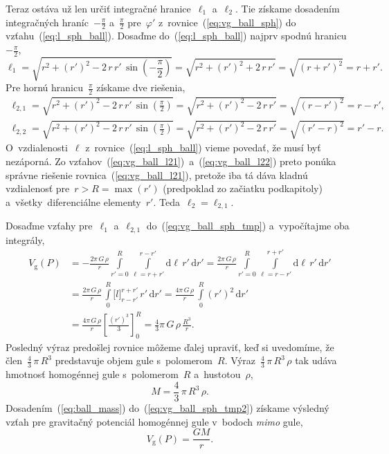 \documentclass[a4paper, 12pt]{book}
\newcommand{\diff}{\mathrm d}
\newcommand{\gidx}{\mathrm g}
\begin{document}
Teraz ostáva už len určiť integračné hranice~$\ell_1$ a~$\ell_2$.  Tie získame 
dosadením integračných hraníc~$-\frac{\pi}{2}$ a~$\frac{\pi}{2}$ pre~$\varphi'$ 
z~rovnice~(\ref{eq:vg_ball_sph}) do vzťahu~(\ref{eq:l_sph_ball}).  Dosaďme 
do~(\ref{eq:l_sph_ball}) najprv spodnú hranicu~$-\frac{\pi}{2}$,
%
\begin{equation}
\label{eq:vg_ball_l1}
\ell_1 = \sqrt{r^2 + (r')^2 - 2 \, r \, r' \, \sin\left(-\frac{\pi}{2}\right)} 
= \sqrt{r^2 + (r')^2 + 2 \, r \, r'} = \sqrt{(r + r')^2} = r + r'{.}
\end{equation}
%
Pre hornú hranicu~$\frac{\pi}{2}$ získame dve riešenia,
%
\begin{align}
\label{eq:vg_ball_l21}
\ell_{2,1} = \sqrt{r^2 + (r')^2 - 2 \, r \, r' \, 
\sin\left(\frac{\pi}{2}\right)} = \sqrt{r^2 + (r')^2 - 2 \, r \, r'} = \sqrt{(r 
- r')^2} = r - r'{,}\\
%
\label{eq:vg_ball_l22}
\ell_{2,2} = \sqrt{r^2 + (r')^2 - 2 \, r \, r' \, 
\sin\left(\frac{\pi}{2}\right)} = \sqrt{r^2 + (r')^2 - 2 \, r \, r'} 
= \sqrt{(r' - r)^2} = r' - r{.}
\end{align}
%
O~vzdialenosti~$\ell$ z~rovnice~(\ref{eq:l_sph_ball}) vieme povedať, že musí 
byť nezáporná.  Zo vzťahov~(\ref{eq:vg_ball_l21})~a~(\ref{eq:vg_ball_l22}) 
preto ponúka správne riešenie rovnica~(\ref{eq:vg_ball_l21}), pretože iba tá 
dáva kladnú vzdialenosť pre~$r > R = \max(r')$ (predpoklad zo začiatku 
podkapitoly) a~všetky~diferenciálne elementy~$r'$.  Teda~$\ell_2 = \ell_{2,1}$.

Dosaďme vzťahy pre~$\ell_1$ a~$\ell_{2,1}$ do~(\ref{eq:vg_ball_sph_tmp}) 
a~vypočítajme oba integrály,
%
\begin{equation}
\label{eq:vg_ball_sph_tmp2}
\begin{split}
V_\gidx(P) &= -\frac{2\pi \, G \, \rho}{r} \int\limits_{r' = 0}^R 
\int\limits_{\ell = r + r'}^{r - r'} \diff \ell \, r' \, \diff r'
%
= \frac{2\pi \, G \, \rho}{r} \int\limits_{r' = 0}^R \int\limits_{\ell 
= r - r'}^{r + r'} \diff \ell \, r' \, \diff r'\\
%
&= \frac{2\pi \, G \, \rho}{r} \,  \int\limits_{0}^R \big[ l \big]_{r - r'}^{r 
+ r'} \, r'  \, \diff r'
%
= \frac{4\pi \, G \, \rho}{r} \, \int\limits_{0}^R (r')^2 \, \diff r'\\
%
&=  \frac{4\pi \, G \, \rho}{r} \left[ \frac{(r')^3}{3} \right]_{0}^{R} 
= \frac{4}{3}\pi \, G \, \rho \, \frac{R^3}{r}{.}
\end{split}
\end{equation}
%
Posledný výraz predošlej rovnice môžeme ďalej upraviť, keď si uvedomíme, že 
člen~$\frac{4}{3} \, \pi \, R^3$ predstavuje objem gule s~polomerom~$R$.  
Výraz~$\frac{4}{3} \, \pi \, R^3 \, \rho$ tak udáva hmotnosť homogénnej gule 
s~polomerom~$R$ a~hustotou~$\rho$,
%
\begin{equation}
\label{eq:ball_mass}
M = \frac{4}{3} \, \pi \, R^3 \, \rho{.}
\end{equation}
%
Dosadením~(\ref{eq:ball_mass}) do~(\ref{eq:vg_ball_sph_tmp2}) získame výsledný 
vzťah pre gravitačný potenciál homogénnej gule v~bodoch \emph{mimo} gule,
%
\begin{equation}
\label{eq:vg_ball_out}
V_\gidx(P) = \frac{GM}{r}{.}
\end{equation}
\end{document}
